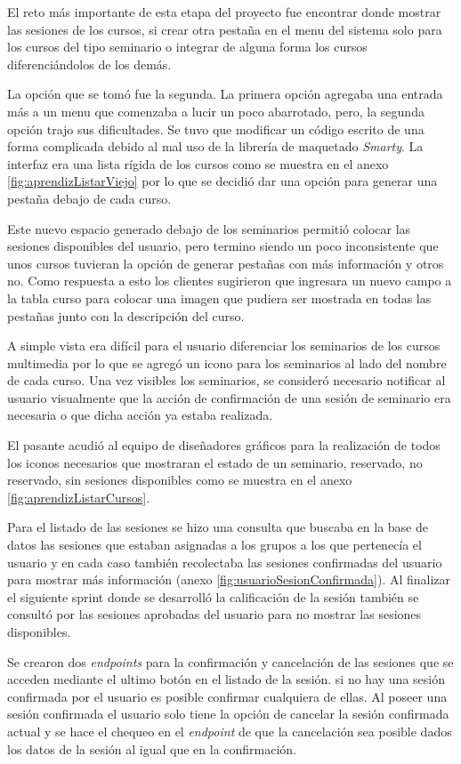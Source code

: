 	El reto más importante de esta etapa del proyecto fue encontrar donde mostrar las sesiones de los cursos, si crear otra pestaña en el menu del sistema solo para los cursos del tipo seminario o integrar de alguna forma los cursos diferenciándolos de los demás.

	La opción que se tomó fue la segunda. La primera opción agregaba una entrada más a un menu que comenzaba a lucir un poco abarrotado, pero, la segunda opción trajo sus dificultades. Se tuvo que modificar un código escrito de una forma complicada debido al mal uso de la librería de maquetado \emph{Smarty}. La interfaz era una lista rígida de los cursos como se muestra en el anexo \ref{fig:aprendizListarViejo} por lo que se decidió dar una opción para generar una pestaña debajo de cada curso.

	Este nuevo espacio generado debajo de los seminarios permitió colocar las sesiones disponibles del usuario, pero termino siendo un poco inconsistente que unos cursos tuvieran la opción de generar pestañas con más información y otros no. Como respuesta a esto los clientes sugirieron que ingresara un nuevo campo a la tabla curso para colocar una imagen que pudiera ser mostrada en todas las pestañas junto con la descripción del curso.

	A simple vista era difícil para el usuario diferenciar los seminarios de los cursos multimedia por lo que se agregó un icono para los seminarios al lado del nombre de cada curso. Una vez visibles los seminarios, se consideró necesario notificar al usuario visualmente que la acción de confirmación de una sesión de seminario era necesaria o que dicha acción ya estaba realizada.

	El pasante acudió al equipo de diseñadores gráficos para la realización de todos los iconos necesarios que mostraran el estado de un seminario, reservado, no reservado, sin sesiones disponibles como se muestra en el anexo \ref{fig:aprendizListarCursos}.

	Para el listado de las sesiones se hizo una consulta que buscaba en la base de datos las sesiones que estaban asignadas a los grupos a los que pertenecía el usuario y en cada caso también recolectaba las sesiones confirmadas del usuario para mostrar más información (anexo \ref{fig:usuarioSesionConfirmada}). Al finalizar el siguiente sprint donde se desarrolló la calificación de la sesión también se consultó por las sesiones aprobadas del usuario para no mostrar las sesiones disponibles.

	Se crearon dos \emph{endpoints} para la confirmación y cancelación de las sesiones que se acceden mediante el ultimo botón en el listado de la sesión. si no hay una sesión confirmada por el usuario es posible confirmar cualquiera de ellas. Al poseer una sesión confirmada el usuario solo tiene la opción de cancelar la sesión confirmada actual y se hace el chequeo en el \emph{endpoint} de que la cancelación sea posible dados los datos de la sesión al igual que en la confirmación.

